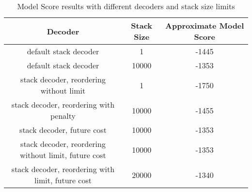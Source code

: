 \documentclass{article}
\begin{document}
\begin{table}[!h]
\caption{Model Score results with different decoders and stack size limits}
\begin{center}

\begin{tabular}{|c|c|c|}
	\hline
	Decoder & Stack Size & Approximate Model Score \\
	\hline
	default stack decoder & 1 & -1445 \\
	\hline
	default stack decoder & 10000 & -1353 \\
	\hline
	stack decoder, reordering without limit & 1 & -1750 \\
	\hline
	stack decoder, reordering with penalty & 10000 & -1455 \\
	\hline
	stack decoder, future cost & 10000 & -1353 \\
	\hline
	stack decoder, reordering without limit, future cost & 10000 & -1353 \\
	\hline
	stack decoder, reordering with limit, future cost & 20000 & -1340 \\
	\hline
\end{tabular}
\end{center}

\end{table}
	
\end{document}
